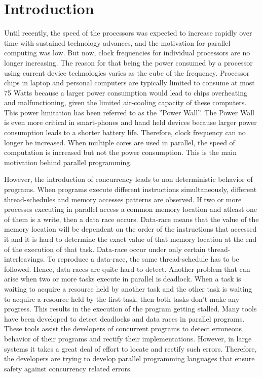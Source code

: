 \section{Introduction}

Until recently, the speed of the processors was expected to increase rapidly over time with sustained technology advances, and the motivation for parallel computing was low. But now, clock frequencies for individual processors are no longer increasing. The reason for that being the power consumed by a processor using current device technologies varies as the cube of the frequency. Processor chips in laptop and personal computers are typically limited to consume at most 75 Watts because a larger power consumption would lead to chips overheating and malfunctioning, given the limited air-cooling capacity of these computers. This power limitation has been referred to as the ''Power Wall''. The Power Wall is even more critical in smart-phones and hand held devices because larger power consumption leads to a shorter battery life. Therefore, clock frequency can no longer be increased. When multiple cores are used in parallel, the speed of computation is increased but not the power consumption. This is the main motivation behind parallel programming.

 However, the introduction of concurrency leads to non deterministic behavior of programs. When programs execute different instructions simultaneously, different thread-schedules and memory accesses patterns are observed. If two or more processes executing in parallel access a common memory location and atleast one of them is a write, then a data race occurs. Data-race means that the value of the memory location will be dependent on the order of the instructions that accessed it and it is hard to determine the exact value of that memory location at the end of the execution of that task. Data-race occur under only certain thread-interleavings. To reproduce a data-race, the same thread-schedule has to be followed. Hence, data-races are quite hard to detect. Another problem that can arise when two or more tasks execute in parallel is deadlock. When a task is waiting to acquire a resource held by another task and the other task is waiting to acquire a resource held by the first task, then both tasks don't make any progress. This results in the execution of the program getting stalled. Many tools have been developed to detect deadlocks and data races in parallel programs. These tools assist the developers of concurrent programs to detect erroneous behavior of their programs and rectify their implementations. However, in large systems it takes a great deal of effort to locate and rectify such errors. Therefore, the developers are trying to develop parallel programming languages that ensure safety against concurrency related errors. 
 

